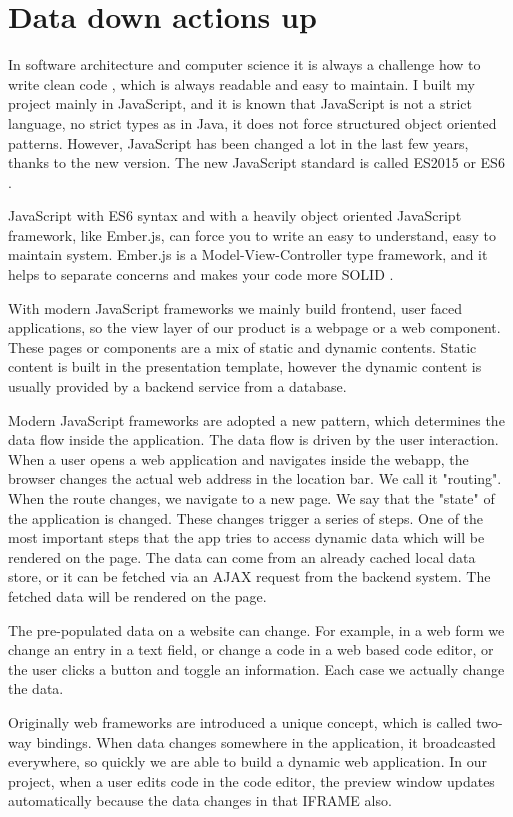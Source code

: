 \documentclass[12pt, a4paper, oneside, openright, medskipamount]{report}
\begin{document}
\section{Data down actions up}

In software architecture and computer science it is always a challenge how to write clean code \cite{clean-code}, which is always readable and easy to maintain. I built my project mainly in JavaScript, and it is known that JavaScript is not a strict language, no strict types as in Java, it does not force structured object oriented patterns. However, JavaScript has been changed a lot in the last few years, thanks to the new version. The new JavaScript standard is called ES2015 or ES6 \cite{es6}.

JavaScript with ES6 syntax and with a heavily object oriented JavaScript framework, like Ember.js, can force you to write an easy to understand, easy to maintain system. Ember.js is a Model-View-Controller type framework, and it helps to separate concerns and makes your code more SOLID \cite{solid}.

With modern JavaScript frameworks we mainly build frontend, user faced applications, so the view layer of our product is a webpage or a web component. These pages or components are a mix of static and dynamic contents. Static content is built in the presentation template, however the dynamic content is usually provided by a backend service from a database.

Modern JavaScript frameworks are adopted a new pattern, which determines the data flow inside the application. The data flow is driven by the user interaction. When a user opens a web application and navigates inside the webapp, the browser changes the actual web address in the location bar. We call it "routing". When the route changes, we navigate to a new page. We say that the "state" of the application is changed. These changes trigger a series of steps. One of the most important steps that the app tries to access dynamic data which will be rendered on the page. The data can come from an already cached local data store, or it can be fetched via an AJAX request from the backend system. The fetched data will be rendered on the page.

The pre-populated data on a website can change. For example, in a web form we change an entry in a text field, or change a code in a web based code editor, or the user clicks a button and toggle an information. Each case we actually change the data.

Originally web frameworks are introduced a unique concept, which is called two-way bindings. When data changes somewhere in the application, it broadcasted everywhere, so quickly we are able to build a dynamic web application. In our project, when a user edits code in the code editor, the preview window updates automatically because the data changes in that IFRAME also.
\end{document}
